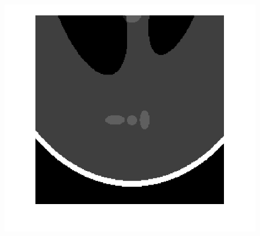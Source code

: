 \documentclass[hyperref]{ctexart}
\begin{document}
{\begin{figure}[htbp]
{				\includegraphics[scale=0.2]{1-2.png}
			}
			\quad
			\quad
			\subfigure[pic1.]{
}
\end{figure}}
\end{document}
